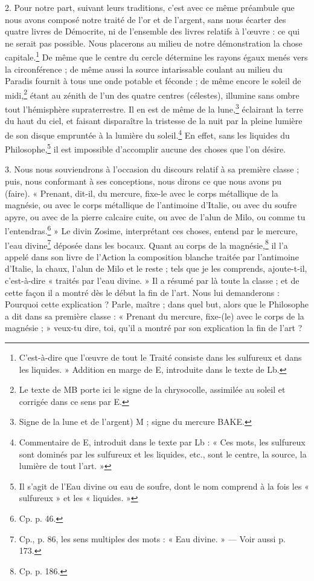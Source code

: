 \documentclass[a4paper, 11pt, oneside, polutonikogreek, french]{article}
\begin{document}
2. Pour notre part, suivant leurs traditions, c'est avec ce même préambule que nous avons composé notre traité de l'or et de l'argent, sans nous écarter des quatre livres de Démocrite, ni de l'ensemble des livres relatifs à l'œuvre : ce qui ne serait pas possible. Nous placerons au milieu de notre démonstration la chose capitale.\footnote{C'est-à-dire que l'œuvre de tout le Traité consiste dans les sulfureux et dans les liquides. » Addition en marge de E, introduite dans le texte de Lb.} De même que le centre du cercle détermine les rayons égaux menés vers la circonférence ; de même aussi la source intarissable coulant au milieu du Paradis fournit à tous une onde potable et féconde ; de même encore le soleil de midi,\footnote{Le texte de MB porte ici le signe de la chrysocolle, assimilée au soleil et corrigée dans ce sens par E.} étant au zénith de l'un des quatre centres (célestes), illumine sans ombre tout l'hémisphère supraterrestre. Il en est de même de la lune,\footnote{Signe de la lune et de l'argent) M ; signe du mercure BAKE.} éclairant la terre du haut du ciel, et faisant disparaître la tristesse de la nuit par la pleine lumière de son disque empruntée à la lumière du soleil.\footnote{Commentaire de E, introduit dans le texte par Lb : « Ces mots, les sulfureux sont dominés par les sulfureux et les liquides, etc., sont le centre, la source, la lumière de tout l'art. »} En effet, sans les liquides du Philosophe,\footnote{Il s'agit de l'Eau divine ou eau de soufre, dont le nom comprend à la fois les « sulfureux » et les « liquides. »} il est impossible d'accomplir aucune des choses que l'on désire.

3. Nous nous souviendrons à l'occasion du discours relatif à sa première classe ; puis, nous conformant à ses conceptions, nous dirons ce que nous avons pu (faire). « Prenant, dit-il, du mercure, fixe-le avec le corps métallique de la magnésie, ou avec le corps métallique de l'antimoine d'Italie, ou avec du soufre apyre, ou avec de la pierre calcaire cuite, ou avec de l'alun de Milo, ou comme tu l'entendras.\footnote{Cp. p. 46.} » Le divin Zosime, interprétant ces choses, entend par le mercure, l'eau divine\footnote{Cp., p. 86, les sens multiples des mots : « Eau divine. » --- Voir aussi p. 173.} déposée dans les bocaux. Quant au corps de la magnésie,\footnote{Cp. p. 186.} il l'a appelé dans son livre de l'Action la composition blanche traitée par l'antimoine d'Italie, la chaux, l'alun de Milo et le reste ; tels que je les comprends, ajoute-t-il, c'est-à-dire « traités par l'eau divine. » Il a résumé par là toute la classe ; et de cette façon il a montré dès le début la fin de l'art. Nous lui demanderons : Pourquoi cette explication ? Parle, maître ; dans quel but, alors que le Philosophe a dit dans sa première classe : « Prenant du mercure, fixe-(le) avec le corps de la magnésie ; » veux-tu dire, toi, qu'il a montré par son explication la fin de l'art ?
\end{document}
